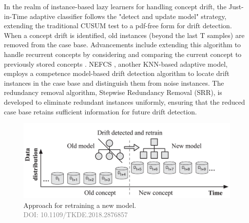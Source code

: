 \begin{enumerate}[label=\Alph*.]
    In the realm of instance-based lazy learners for handling concept drift, the Just-in-Time adaptive classifier \cite{alippi2008just}  follows the "detect and update model" strategy, extending the traditional CUSUM test \cite{manly2000cumulative} to a pdf-free form for drift detection. When a concept drift is identified, old instances (beyond the last T samples) are removed from the case base. Advancements include extending this algorithm to handle recurrent concepts by considering and comparing the current concept to previously stored concepts \cite{silva2013data, alippi2008just}. NEFCS \cite{lu2016concept}, another KNN-based adaptive model, employs a competence model-based drift detection algorithm \cite{lu2016concept} to locate drift instances in the case base and distinguish them from noise instances. The redundancy removal algorithm, Stepwise Redundancy Removal (SRR), is developed to eliminate redundant instances uniformly, ensuring that the reduced case base retains sufficient information for future drift detection.
    

\begin{figure}[!ht]
    \centering
    \includegraphics[width=.9\textwidth]{2_Background/figures/retrain.png}
    \caption{Approach for retraining a new model. \\ \textcolor{gray}{\fontsize{10}{0}\selectfont DOI: 10.1109/TKDE.2018.2876857}}
    \label{fig:concept-drift-adaptation}
\end{figure}






\end{enumerate}
